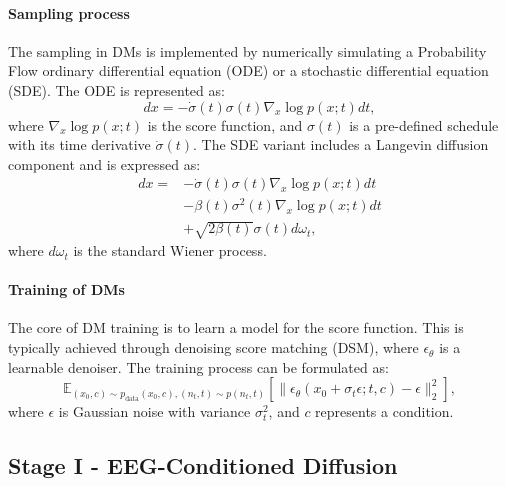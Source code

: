 \documentclass{article}
\begin{document}
\paragraph{Sampling process} The sampling in DMs is implemented by numerically simulating a Probability Flow ordinary differential equation (ODE) or a stochastic differential equation (SDE). The ODE is represented as:
\begin{equation}
dx = -\dot{\sigma}(t)\sigma(t)\nabla_x \log p(x; t) dt,
\end{equation}
where \( \nabla_x \log p(x; t) \) is the score function, and \( \sigma(t) \) is a pre-defined schedule with its time derivative \( \dot{\sigma}(t) \). The SDE variant includes a Langevin diffusion component and is expressed as:
\begin{equation}
\begin{split}
dx = &-\dot{\sigma}(t)\sigma(t)\nabla_x \log p(x; t) dt \\
& - \beta(t)\sigma^2(t)\nabla_x \log p(x; t) dt \\
& + \sqrt{2\beta(t)}\sigma(t) d\omega_t,
\end{split}
\end{equation}
where \( d\omega_t \) is the standard Wiener process.

\paragraph{Training of DMs} The core of DM training is to learn a model for the score function. This is typically achieved through denoising score matching (DSM), where \( \epsilon_{\theta} \) is a learnable denoiser. The training process can be formulated as:
\begin{equation}
\mathbb{E}_{(x_0, c) \sim p_{\text{data}}(x_0, c), (n_t, t) \sim p(n_t, t)} \left[ \| \epsilon_{\theta}(x_0 + \sigma_t \epsilon; t, c) - \epsilon \|_2^2 \right],
\end{equation}
where \(\epsilon\) is Gaussian noise with variance \(\sigma_t^2\), and \( c \) represents a condition.

\subsection{Stage I - EEG-Conditioned Diffusion}
\end{document}
